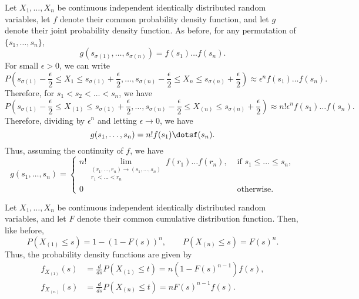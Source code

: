 \documentclass[11pt]{article}
\newcommand\dd[3][]{\frac{d^{#1}{#2}}{d {#3}^{#1}}}
\theoremstyle{definition}
\theoremstyle{remark}
\numberwithin{equation}{module}
\begin{document}
    \begin{theorem}
        Let $X_1, \dots, X_n$ be continuous independent identically distributed random
        variables, let $f$ denote their common probability density function, and let
        $g$ denote their joint probability density function.
        As before, for any permutation of $\{s_1, \dots, s_n\}$, \[
            g(s_{\sigma(1)}, \dots, s_{\sigma(n)}) = f(s_1) \dots f(s_n).
        \] For small $\epsilon > 0$, we can write \[
            P\left(s_{\sigma(1)} - \frac{\epsilon}{2} \leq X_1 \leq s_{\sigma(1)} +
            \frac{\epsilon}{2}, \dots,  s_{\sigma(n)} - \frac{\epsilon}{2} \leq X_n
            \leq s_{\sigma(n)} + \frac{\epsilon}{2}\right) \approx
            \epsilon^nf(s_1)\dots f(s_n).
        \] Therefore, for $s_1 < s_2 < \dots < s_n$, we have \[
            P\left(s_{\sigma(1)} - \frac{\epsilon}{2} \leq X_{(1)} \leq
            s_{\sigma(1)} + \frac{\epsilon}{2}, \dots,  s_{\sigma(n)} -
            \frac{\epsilon}{2} \leq X_{(n)} \leq s_{\sigma(n)} +
            \frac{\epsilon}{2}\right) \approx n!\epsilon^nf(s_1)\dots f(s_n).
        \] Therefore, dividing by $\epsilon^n$ and letting $\epsilon \to 0$, we have
        \[
            g(s_1, \dots, s_n) = n! f(s_1)\dotsf(s_n).
        \] Thus, assuming the continuity of $f$, we have \[
            g(s_1, \dots, s_n) = \begin{cases}
                n!\lim_{\substack{(r_1, \dots, r_n) \to (s_1, \dots, s_n) \\ r_1 <
                \dots < r_n}} f(r_1) \dots f(r_n), &\text{ if }s_1 \leq \dots \leq
                s_n, \\
                0 &\text{ otherwise}.
            \end{cases}
        \] 
    \end{theorem}
    
    \begin{theorem}
        Let $X_1, \dots, X_n$ be continuous independent identically distributed random
        variables, and let $F$ denote their common cumulative distribution function.
        Then, like before, \[
            P(X_{(1)} \leq s) = 1 - (1 - F(s))^n, \qquad
            P(X_{(n)} \leq s) = F(s)^n.
        \] Thus, the probability density functions are given by \begin{align*}
            f_{X_{(1)}}(s) &= \dd{}{s}P(X_{(1)} \leq t) = n (1 - F(s)^{n - 1}) f(s), \\
            f_{X_{(n)}}(s) &= \dd{}{s}P(X_{(n)} \leq t) = n F(s)^{n - 1} f(s).
        \end{align*}
    \end{theorem}
    
\end{document}
